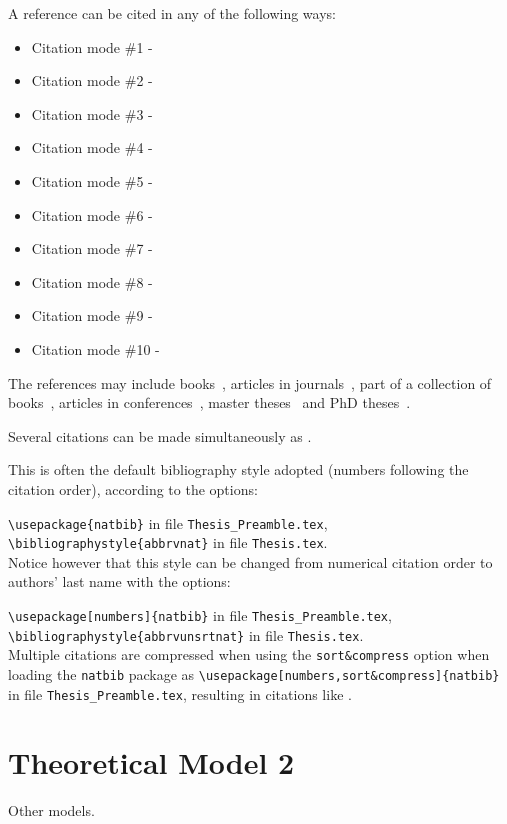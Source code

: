 A reference can be cited in any of the following ways:
%
\begin{itemize}
  \item Citation mode \#1 - \quad \cite{Marta:AeroBest2021}
  \item Citation mode \#2 - \quad \citet{Marta:AeroBest2021}
  \item Citation mode \#3 - \quad \citep{Marta:AeroBest2021}
  \item Citation mode \#4 - \quad \citet*{Marta:AeroBest2021}
  \item Citation mode \#5 - \quad \citep*{Marta:AeroBest2021}
  \item Citation mode \#6 - \quad \citealt{Marta:AeroBest2021}
  \item Citation mode \#7 - \quad \citealp{Marta:AeroBest2021}
  \item Citation mode \#8 - \quad \citeauthor{Marta:AeroBest2021}
  \item Citation mode \#9 - \quad \citeyear{Marta:AeroBest2021}
  \item Citation mode \#10 - \quad \citeyearpar{Marta:AeroBest2021}
\end{itemize}

The references may include books~\cite{Marta:AeroBest2021}, articles in journals~\cite{Morgado:2022:SAMO}, part of a collection of books~\cite{jameson:adjointns}, articles in conferences~\cite{Alves:ICUAS:2022}, master theses~\cite{Pacheco:MSc} and PhD theses~\cite{Rodrigues:PhD}.

Several citations can be made simultaneously as \cite{Campos:2021:QJMAM,Alexandre:2020:PLOS}.

This is often the default bibliography style adopted (numbers following the citation order), according to the options:

{\tt \textbackslash usepackage\{natbib\}} in file {\tt Thesis\_Preamble.tex},\\
{\tt \textbackslash bibliographystyle\{abbrvnat\}} in file {\tt Thesis.tex}.\\

Notice however that this style can be changed from numerical citation order to authors' last name with the options:

{\tt \textbackslash usepackage[numbers]\{natbib\}} in file {\tt Thesis\_Preamble.tex},\\
{\tt \textbackslash bibliographystyle\{abbrvunsrtnat\}} in file {\tt Thesis.tex}. \\

Multiple citations are compressed when using the {\tt sort\&compress} option when loading the {\tt natbib} package as {\tt \textbackslash usepackage[numbers,sort\&compress]\{natbib\}} in file {\tt Thesis\_Preamble.tex}, resulting in citations like \cite{Pacheco:2024:JAUTO,Portugal:2024:MODELLING,Matos:2022:AEROSPACE,Rodrigues:2020:SAMO,Rodrigues:2019:RENE,Campos:2018:JSV,Rodrigues:2018:CAF,Campos:2015:GAFD,Marta:2014:JPP,Rodrigues:2014:SMO,Campos:2014:IJMS,Marta:2013:AIAAJ,Marta:2013:CAF,Marta:2010:CAF,Marta:2007:IJCFD}.


\section{Theoretical Model 2}
\label{section:theory2}

Other models.

